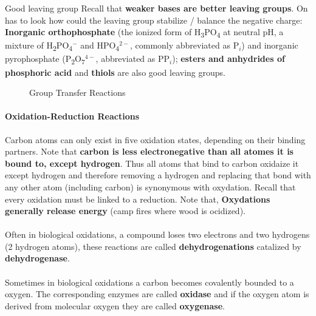 \documentclass[../main.tex]{subfiles}
\begin{document}
\begin{RemarkWithTitel}{Good leaving group}
	Recall that \textbf{weaker bases are better leaving groups}. On has to look how could the leaving group stabilize / balance the negative charge: 
	\textbf{Inorganic orthophosphate} (the ionized form of H\textsubscript{3}PO\textsubscript{4} at neutral pH, a mixture of H\textsubscript{2}PO\textsubscript{4}$^-$ and HPO\textsubscript{4}$^{2-}$, commonly abbreviated as \( \text{P}_i \)) and inorganic pyrophosphate (P\textsubscript{2}O\textsubscript{7}$^{4-}$, abbreviated as \( \text{PP}_i \)); \textbf{esters and anhydrides of phosphoric acid} and \textbf{thiols} are also good leaving groups. 
\end{RemarkWithTitel}

\begin{figure}[h]
	\centering
	\hfill
	\caption{Group Transfer Reactions}
\end{figure}


\paragraph{Oxidation-Reduction Reactions}
Carbon atoms can only exist in five oxidation states, depending on their binding partners. Note that \textbf{carbon is less electronegative than all atomes it is bound to, except hydrogen}. Thus all atoms that bind to carbon oxidaize it except hydrogen and therefore removing a hydrogen and replacing that bond with any other atom (including carbon) is synonymous with oxydation. Recall that every oxidation must be linked to a reduction. Note that, \textbf{Oxydations generally release energy} (camp fires where wood is ocidized). \\
\\
Often in biological oxidations, a compound loses two electrons and two hydrogens (2 hydrogen atoms), these reactions are called \textbf{dehydrogenations} catalized by \textbf{\gls{dehydrogenase}}. \\
\\
Sometimes in biological oxidations a carbon becomes covalently bounded to a oxygen. The corresponding enzymes are called \textbf{\gls{oxidase}} and if the oxygen atom is derived from molecular oxygen they are called \textbf{\gls{oxygenase}}. 
\end{document}

